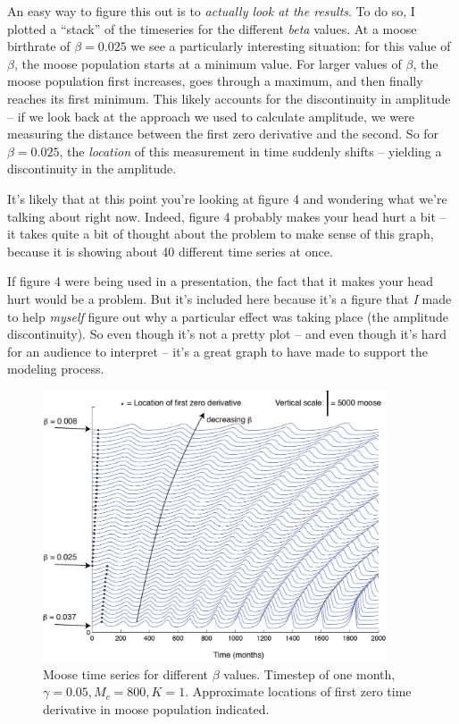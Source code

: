 \documentclass{tufte-handout}
\begin{document}
An easy way to figure this out is to {\it actually look at the results}.  To do so, I plotted a ``stack'' of the timeseries for the different {\it beta} values.  At a moose birthrate of $\beta = 0.025$ we see a particularly interesting situation:  for this value of $\beta$, the moose population starts at a minimum value.  For larger values of $\beta$, the moose population first increases, goes through a maximum, and then finally reaches its first minimum.  This likely accounts for the discontinuity in amplitude -- if we look back at the approach we used to calculate amplitude, we were measuring the distance between the first zero derivative and the second.  So for $\beta = 0.025$, the {\it location} of this measurement in time suddenly shifts -- yielding a discontinuity in the amplitude. 

It's likely that at this point you're looking at figure 4 and wondering what we're talking about right now.  Indeed, figure 4 probably makes your head hurt a bit -- it takes quite a bit of thought about the problem to make sense of this graph, because it is showing about 40 different time series at once.   

If figure 4 were being used in a presentation, the fact that it makes your head hurt would be a problem.  But it's included here because  it's a figure that {\it I} made to help {\it myself} figure out why a particular effect was taking place (the amplitude discontinuity).  So even though it's not a pretty plot -- and even though it's hard for an audience to interpret -- it's a great graph to have made to support the modeling process.

\begin{figure}[h!]
\includegraphics[width=4in]{figs/MooseBCSweepStackWFD}
\caption{Moose time series for different $\beta$ values.  Timestep of one month,  $\gamma = 0.05, M_c = 800, K=1$.  Approximate locations of first zero time derivative in moose population indicated.}
\end{figure}
\end{document}
